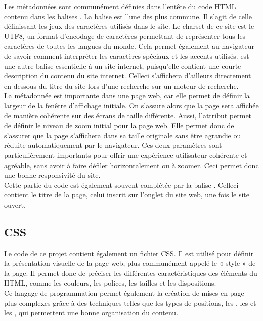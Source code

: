 \documentclass[a4,10pt,french]{sphinxmanual}
\begin{document}
\sphinxAtStartPar
Les métadonnées sont communément définies dans l’entête du code HTML contenu dans les balises .
La balise  est l’une des plus commune. Il s’agit de celle définissant les jeux des caractères utilisés dans le site. Le charset de ce site est le UTF\sphinxhyphen{}8, un format d’encodage de caractères permettant de représenter tous les caractères de toutes les langues du monde. Cela permet également au navigateur de savoir comment interpréter les caractères spéciaux et les accents utilisés.
 est une autre balise essentielle à un site internet, puisqu’elle contient une courte description du contenu du site internet. Celle\sphinxhyphen{}ci s’affichera d’ailleurs directement en dessous du titre du site lors d’une recherche sur un moteur de recherche.\\
La métadonnée  est importante dans une page web, car elle permet de définir la largeur de la fenêtre d’affichage initiale. On s’assure alors que la page sera affichée de manière cohérente sur des écrans de taille différente. Aussi, l’attribut  permet de définir le niveau de zoom initial pour la page web. Elle permet donc de s’assurer que la page s’affichera dans sa taille originale sans être agrandie ou réduite automatiquement par le navigateur. Ces deux paramètres sont particulièrement importants pour offrir une expérience utilisateur cohérente et agréable, sans avoir à faire défiler horizontalement ou à zoomer. Ceci permet donc une bonne responsivité du site.\\
Cette partie du code est également souvent complétée par la balise . Celle\sphinxhyphen{}ci contient le titre de la page, celui inscrit sur l’onglet du site web, une fois le site ouvert.


\subsection{CSS}
\label{\detokenize{chapitre-02:css}}
\sphinxAtStartPar
Le code de ce projet contient également un fichier CSS. Il est utilisé pour définir la présentation visuelle de la page web, plus communément appelé le « style » de la page. Il permet donc de préciser les différentes caractéristiques des éléments du HTML, comme les couleurs, les polices, les tailles et les dispositions.\\
Ce langage de programmation permet également la création de mises en page plus complexes grâce à des techniques telles que les types de positions, les , les  et les , qui permettent une bonne organisation du contenu.
\end{document}
